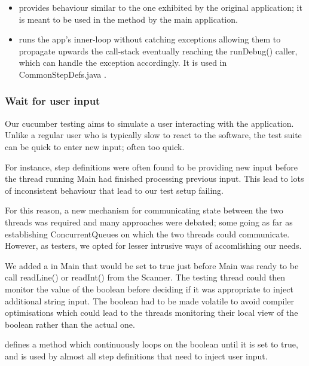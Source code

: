 \begin{itemize}
	\item {} provides behaviour similar to the one exhibited by the original application; it is meant to be used in the  method by the main application. 
	\item {} runs the app's inner-loop without catching exceptions allowing them to propagate upwards the call-stack eventually reaching the runDebug() caller, which can handle the exception accordingly. It is used in CommonStepDefs.java . 
\end{itemize}

\subsubsection{Wait for user input}
Our cucumber testing aims to simulate a user interacting with the application.  Unlike a regular user who is typically slow to react to the software, the test suite can be quick to enter new input; often too quick. 
\par
For instance, step definitions were often found to be providing new input before the thread running Main had finished processing previous input. This lead to lots of inconsistent behaviour that lead to our test setup failing. 
\par 
For this reason, a new mechanism for communicating state between the two threads was required and many approaches were debated; some going as far as establishing ConcurrentQueues on which the two threads could communicate.
However, as testers, we opted for lesser intrusive ways of accomlishing our needs. 
\par 
We added a  in Main that would be set to true just before Main was ready to be call readLine() or readInt() from the Scanner. The testing thread could then monitor the value of the boolean before deciding if it was appropriate to inject additional string input. The boolean had to be made volatile to avoid compiler optimisations which could lead to the threads monitoring their local view of the boolean rather than the actual one. 
\par 
{} defines a method  which continuously loops on the boolean until it is set to true, and is used by almost all step definitions that need to inject user input. 

